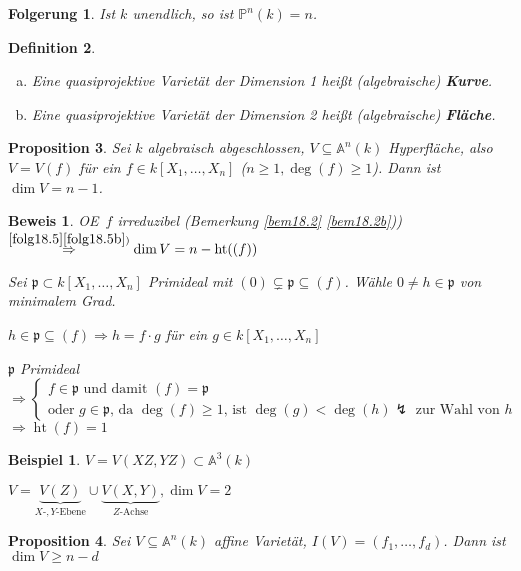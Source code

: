 \documentclass[a4paper, 12pt, numbers=noendperiod, chapterprefix=true]{scrbook}
\theoremstyle{break}
\newtheorem{Def}{Definition}[section]
\newtheorem{Prop}[Def]{Proposition}
\newtheorem{Folg}[Def]{Folgerung}
\theoremstyle{nonumberbreak}
\newtheorem{nnBsp}{Beispiel}
\newtheorem{Bew}{Beweis}
\theoremstyle{nonumberplain}
\newcommand{\emp}[1]{\textbf{\emph{#1}}}
\newcommand{\defterm}[1]{{\index{#1}}\emp{#1}}
\DeclareMathOperator{\Ht}{ht}
\newcommand{\A}{\mathbb{A}}
\newcommand{\IP}{\mathbb{P}}%
\renewcommand{\OE}{O\!\!E~}
\begin{document}
\begin{Folg}
Ist $k$ unendlich, so ist $\IP^n(k)=n$.
\end{Folg}

\begin{Def}\begin{enumerate}[a)]
\item
	Eine quasiprojektive Variet\"at der Dimension 1 hei\ss t (algebraische) \defterm{Kurve}.
\item
	Eine quasiprojektive Variet\"at der Dimension 2 hei\ss t (algebraische) \defterm{Fl\"ache}.
\end{enumerate}\end{Def}

\begin{Prop}
Sei $k$ algebraisch abgeschlossen, $V\subseteq\A^n(k)$ Hyperfl\"ache, also $V=V(f)$ f\"ur ein $f\in k[X_1,\ldots ,X_n]$ ($n\ge1, \deg(f)\ge1$). Dann ist $\dim V=n-1$.
\end{Prop}

\begin{Bew}
\OE $f$ irreduzibel (Bemerkung \ref{bem18.2} \ref{bem18.2b})) $\overset{\ref{folg18.5} \ref{folg18.5b})}{\Rightarrow } \dim V=n-\Ht((f))$

Sei $\mathfrak p\subset k[X_1,\ldots ,X_n]$ Primideal mit $(0)\subsetneq \mathfrak p\subseteq(f)$. W\"ahle $0\ne h\in \mathfrak p$ von minimalem Grad.

$h\in \mathfrak p\subseteq(f)\Rightarrow h=f\cdot g$ f\"ur ein $g\in k[X_1,\ldots ,X_n]$

$\mathfrak p$ Primideal $\Rightarrow \left\{\begin{array}{l}
	f\in \mathfrak p \text{ und damit } (f)=\mathfrak p\\
	\text{oder } g\in \mathfrak p \text{, da } \deg(f)\ge1\text{, ist }\deg(g)<\deg(h) \lightning \text{ zur Wahl von }h\end{array}\right.$\\
$\Rightarrow \Ht(f)=1$
\end{Bew}

\begin{nnBsp}
$V=V(XZ,YZ)\subset\A^3(k)$

$V=\underbrace{V(Z)}_{X\text{-},Y\text{-}\text{Ebene}} \cup \underbrace{V(X,Y)}_{Z\text{-}\text{Achse}}, \dim V=2$
\end{nnBsp}

\begin{Prop}
Sei $V\subseteq\A^n(k)$ affine Variet\"at, $I(V)=(f_1,\ldots ,f_d)$. Dann ist $\dim V\ge n-d$
\end{Prop}
\end{document}
